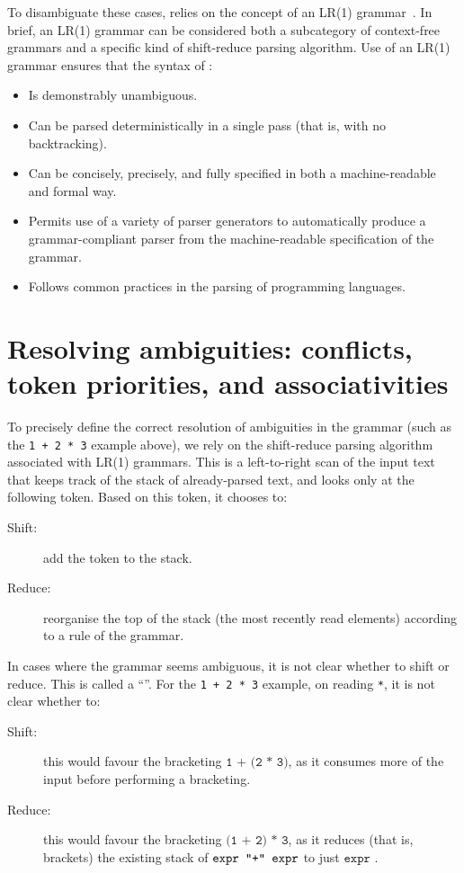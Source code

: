 To disambiguate these cases, \ASLvOneterm{} relies on the concept of an LR(1)
grammar~\cite{ASU86}.
In brief, an LR(1) grammar can be considered both a subcategory of context-free
grammars  and a specific kind of shift-reduce parsing algorithm.
Use of an LR(1) grammar ensures that the syntax of \ASLvOneterm{}:
\begin{itemize}
  \item Is demonstrably unambiguous.
  \item Can be parsed deterministically in a single pass
        (that is, with no backtracking).
  \item Can be concisely, precisely, and fully specified in both a
        machine-readable and formal way.
  \item Permits use of a variety of parser generators to automatically produce
        a grammar-compliant parser from the machine-readable specification
        of the grammar.
  \item Follows common practices in the parsing of programming languages.
\end{itemize}

\section*{Resolving ambiguities: conflicts, token priorities, and associativities}

To precisely define the correct resolution of ambiguities in the \ASLvOneterm{} grammar
(such as the \texttt{1 + 2 * 3} example above), we rely on the shift-reduce parsing
algorithm associated with LR(1) grammars. This is a left-to-right scan of the input
text that keeps track of the stack of already-parsed text, and looks only at the
following token. Based on this token, it chooses to:
\begin{description}
  \item[Shift:] add the token to the stack.
  \item[Reduce:] reorganise the top of the stack (the most recently read elements)
according to a rule of the grammar.
\end{description}

\hypertarget{def-shiftreduceconflict}{}
In cases where the grammar seems ambiguous, it is not clear whether to shift or
reduce. This is called a ``\emph{\shiftreduceconflictterm}''. For the \texttt{1 + 2 * 3} example,
on reading \texttt{*}, it is not clear whether to:
\begin{description}
  \item[Shift:] this would favour the bracketing $\texttt{1 + (2 * 3)}$, as it
  consumes more of the input before performing a bracketing.
  \item[Reduce:] this would favour the bracketing $\texttt{(1 + 2) * 3}$, as it
  reduces (that is, brackets) the existing stack of $\texttt{expr \texttt{"}\texttt{+}\texttt{"}{} expr}$ to just
  $\texttt{expr}$ .
\end{description}


